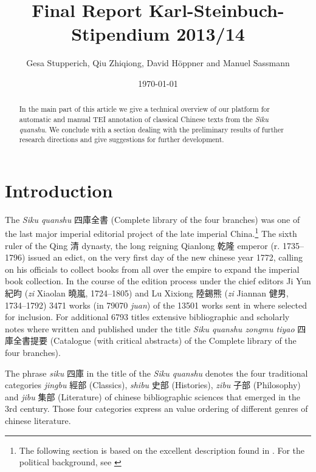 \documentclass[12pt, draft]{article}
\begin{document}
\title{Final Report Karl-Steinbuch-Stipendium 2013/14}
\author{Gesa Stupperich, Qiu Zhiqiong, David Höppner and Manuel Sassmann}
\date{\today}
\maketitle

\begin{abstract}
In the main part of this article we
give a technical overview of
our platform for automatic and manual
TEI annotation of classical Chinese texts from the \emph{Siku quanshu}.
We conclude with a section dealing with the preliminary results of further research directions and give suggestions for further development.
\end{abstract}

\section{Introduction}

The \emph{Siku quanshu} 四庫全書 (Complete library of the four branches)
was one of the last major imperial editorial project of the
late imperial China.\footnote{The following section is based on the excellent
description found in \cite[945-954]{Wilkinson:2012}. For the political
background, see \cite{Guy:1987}}
The sixth ruler of the Qing 清 dynasty, the long reigning
Qianlong 乾隆 emperor (r. 1735--1796) issued an edict,
on the very first
day of the new chinese year 1772, calling on his officials to collect books from
all over the empire to expand the imperial book collection.
In the course of the edition process under the
chief editors Ji Yun 紀昀 (\emph{zi} Xiaolan 曉嵐, 1724--1805) and Lu Xixiong 陸錫熊
(\emph{zi} Jiannan 健男, 1734--1792) 3471 works (in 79070 \emph{juan})
of the 13501 works sent in where selected for inclusion.
For additional 6793 titles extensive bibliographic and scholarly
notes where written and published under the title \emph{Siku quanshu zongmu tiyao}
四庫全書提要 (Catalogue (with critical abstracts) of the Complete library of the 
four branches).

The phrase \emph{siku} 四庫 in the title of the \emph{Siku quanshu}
denotes the four traditional categories \emph{jingbu} 經部
(Classics), \emph{shibu} 史部 (Histories), \emph{zibu} 子部 (Philosophy)
and \emph{jibu} 集部 (Literature)
of chinese bibliographic sciences that emerged in the 3rd century.
Those four categories express an value ordering of
different genres of chinese literature.
\end{document}
